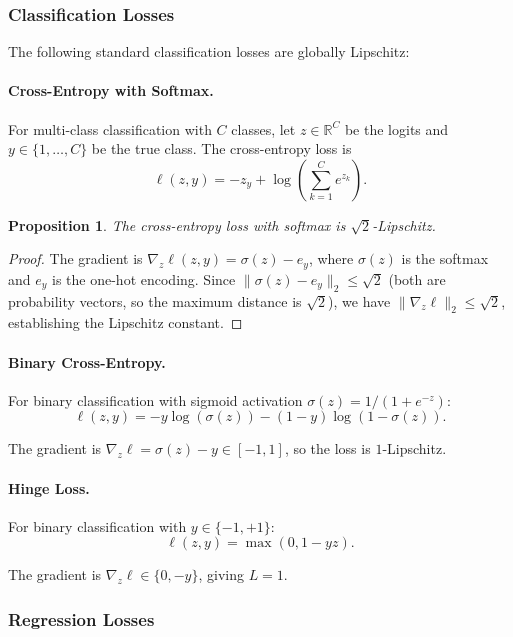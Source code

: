 \documentclass{article}
\theoremstyle{plain}
\newtheorem{proposition}[theorem]{Proposition}
\theoremstyle{definition}
\theoremstyle{remark}
\begin{document}
\subsubsection{Classification Losses}

The following standard classification losses are globally Lipschitz:

\paragraph{Cross-Entropy with Softmax.}

For multi-class classification with $C$ classes, let $z \in \mathbb{R}^C$ be the logits and $y \in \{1, \ldots, C\}$ be the true class. The cross-entropy loss is
\[
\ell(z, y) = -z_y + \log\left(\sum_{k=1}^{C} e^{z_k}\right).
\]

\begin{proposition}
The cross-entropy loss with softmax is $\sqrt{2}$-Lipschitz.
\end{proposition}

\begin{proof}
The gradient is $\nabla_z \ell(z, y) = \sigma(z) - e_y$, where $\sigma(z)$ is the softmax and $e_y$ is the one-hot encoding. Since $\|\sigma(z) - e_y\|_2 \leq \sqrt{2}$ (both are probability vectors, so the maximum distance is $\sqrt{2}$), we have $\|\nabla_z \ell\|_2 \leq \sqrt{2}$, establishing the Lipschitz constant.
\end{proof}

\paragraph{Binary Cross-Entropy.}

For binary classification with sigmoid activation $\sigma(z) = 1/(1 + e^{-z})$:
\[
\ell(z, y) = -y\log(\sigma(z)) - (1-y)\log(1-\sigma(z)).
\]

The gradient is $\nabla_z \ell = \sigma(z) - y \in [-1, 1]$, so the loss is $1$-Lipschitz.

\paragraph{Hinge Loss.}

For binary classification with $y \in \{-1, +1\}$:
\[
\ell(z, y) = \max(0, 1 - yz).
\]

The gradient is $\nabla_z \ell \in \{0, -y\}$, giving $L = 1$.

\subsubsection{Regression Losses}
\end{document}
